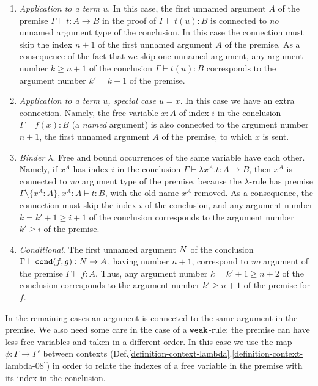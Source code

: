 \begin{enumerate}

\item
\emph{Application to a term $u$}. 
In this case, the first unnamed argument $A$ of the premise 
$\Gamma \vdash t:A \rightarrow B$ in 
the proof of $\Gamma \vdash t(u):B$ is connected to \emph{no} 
unnamed argument type of the conclusion.
In this case the connection must skip the index $n+1$
of the first unnamed argument $A$ of the premise. As a consequence
of the fact that we skip one unnamed argument, any argument number 
$k \ge n+1$ of the conclusion $\Gamma \vdash t(u):B$
corresponds to the argument number $k' = k+1$ of the premise. 

\item
\emph{Application to a term $u$, special case $u=x$}. 
In this case we have an extra connection. 
Namely, the free variable $x:A$ of index $i$ in the conclusion 
$\Gamma \vdash f(x) : B$ (a \emph{named} argument) 
is also connected to the argument number $n+1$, the 
first unnamed argument $A$ of the premise, to which $x$ is sent.

\item
\emph{Binder $\lambda$}. Free and bound occurrences of the same variable
have  each other.
Namely, if $x^A$ has index $i$ in the conclusion 
$\Gamma \vdash \lambda x^A.t : A \rightarrow B$, 
then $x^A$ is connected to \emph{no} argument type of the premise, because the 
$\lambda$-rule has premise 
$\Gamma \setminus \{x^A:A\}, x^A:A \vdash t : B$, 
with the old name $x^A$ removed.
As a consequence, the connection must skip the index $i$ of the conclusion,
and any argument number $k=k'+1 \ge i+1$ of the conclusion 
corresponds to the argument number $k' \ge i$ of the premise. 

\item
\emph{Conditional}.
The first unnamed argument ${N}$ of the conclusion 
$\Gamma \vdash {\tt cond}(f,g):{N} \rightarrow A$, having number $n+1$, 
correspond to \emph{no} argument of the premise $\Gamma \vdash f:A$. 
Thus, any argument number $k = k'+1 \ge n+2$ 
of the conclusion corresponds to the argument 
number $k' \ge n+1$ of the premise for $f$. 
\end{enumerate}

In the remaining cases an argument is connected to the same argument in the 
premise. We also need some care in the case of a ${\tt weak}$-rule: the premise can
have less free variables and taken in a different order. 
In this case we use the map $\phi:\Gamma \rightarrow \Gamma'$ between contexts 
(Def.\ref{definition-context-lambda}.\ref{definition-context-lambda-08}) 
in order to relate the indexes of a free variable in the premise with its index in the 
conclusion. 

